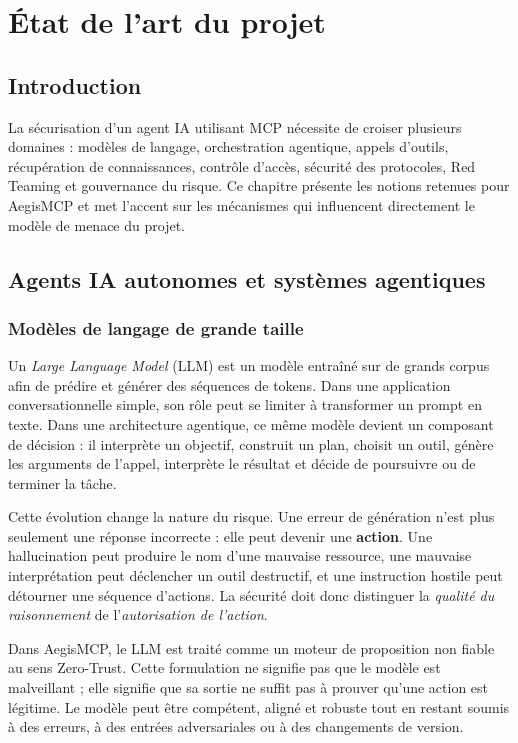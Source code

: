 \chapter{État de l'art du projet}

\section*{Introduction}

La sécurisation d'un agent IA utilisant MCP nécessite de croiser plusieurs domaines : modèles de langage, orchestration agentique, appels d'outils, récupération de connaissances, contrôle d'accès, sécurité des protocoles, Red Teaming et gouvernance du risque. Ce chapitre présente les notions retenues pour AegisMCP et met l'accent sur les mécanismes qui influencent directement le modèle de menace du projet.

\section{Agents IA autonomes et systèmes agentiques}

\subsection{Modèles de langage de grande taille}

Un \textit{Large Language Model} (LLM) est un modèle entraîné sur de grands corpus afin de prédire et générer des séquences de tokens. Dans une application conversationnelle simple, son rôle peut se limiter à transformer un prompt en texte. Dans une architecture agentique, ce même modèle devient un composant de décision : il interprète un objectif, construit un plan, choisit un outil, génère les arguments de l'appel, interprète le résultat et décide de poursuivre ou de terminer la tâche.

Cette évolution change la nature du risque. Une erreur de génération n'est plus seulement une réponse incorrecte : elle peut devenir une \textbf{action}. Une hallucination peut produire le nom d'une mauvaise ressource, une mauvaise interprétation peut déclencher un outil destructif, et une instruction hostile peut détourner une séquence d'actions. La sécurité doit donc distinguer la \emph{qualité du raisonnement} de l'\emph{autorisation de l'action}.

Dans AegisMCP, le LLM est traité comme un moteur de proposition non fiable au sens Zero-Trust. Cette formulation ne signifie pas que le modèle est malveillant ; elle signifie que sa sortie ne suffit pas à prouver qu'une action est légitime. Le modèle peut être compétent, aligné et robuste tout en restant soumis à des erreurs, à des entrées adversariales ou à des changements de version.

